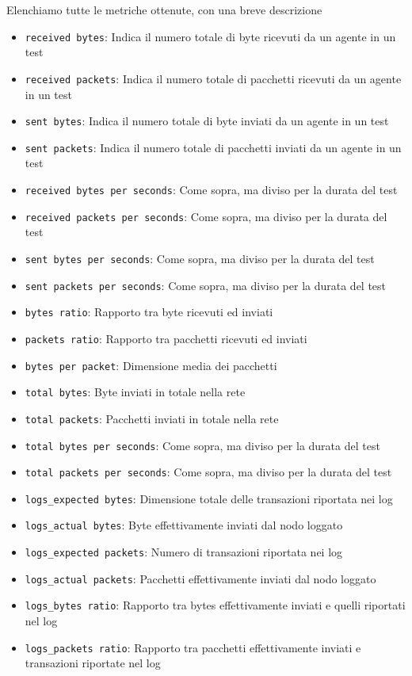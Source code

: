 \documentclass[12pt, a4paper]{article}
\begin{document}
Elenchiamo tutte le metriche ottenute, con una breve descrizione

\begin{itemize}
    \item \lstinline{received bytes}: Indica il numero totale di byte ricevuti da un agente in un test
    \item \lstinline{received packets}: Indica il numero totale di pacchetti ricevuti da un agente in un test
    \item \lstinline{sent bytes}: Indica il numero totale di byte inviati da un agente in un test
    \item \lstinline{sent packets}: Indica il numero totale di pacchetti inviati da un agente in un test
    \item \lstinline{received bytes per seconds}: Come sopra, ma diviso per la durata del test
    \item \lstinline{received packets per seconds}: Come sopra, ma diviso per la durata del test
    \item \lstinline{sent bytes per seconds}: Come sopra, ma diviso per la durata del test
    \item \lstinline{sent packets per seconds}: Come sopra, ma diviso per la durata del test
    \item \lstinline{bytes ratio}: Rapporto tra byte ricevuti ed inviati
    \item \lstinline{packets ratio}: Rapporto tra pacchetti ricevuti ed inviati
    \item \lstinline{bytes per packet}: Dimensione media dei pacchetti
    \item \lstinline{total bytes}: Byte inviati in totale nella rete
    \item \lstinline{total packets}: Pacchetti inviati in totale nella rete
    \item \lstinline{total bytes per seconds}: Come sopra, ma diviso per la durata del test
    \item \lstinline{total packets per seconds}: Come sopra, ma diviso per la durata del test
    \item \lstinline{logs_expected bytes}: Dimensione totale delle transazioni riportata nei log
    \item \lstinline{logs_actual bytes}: Byte effettivamente inviati dal nodo loggato
    \item \lstinline{logs_expected packets}: Numero di transazioni riportata nei log
    \item \lstinline{logs_actual packets}: Pacchetti effettivamente inviati dal nodo loggato
    \item \lstinline{logs_bytes ratio}: Rapporto tra bytes effettivamente inviati e quelli riportati nel log
    \item \lstinline{logs_packets ratio}: Rapporto tra pacchetti effettivamente inviati e transazioni riportate nel log
\end{itemize}
\end{document}

